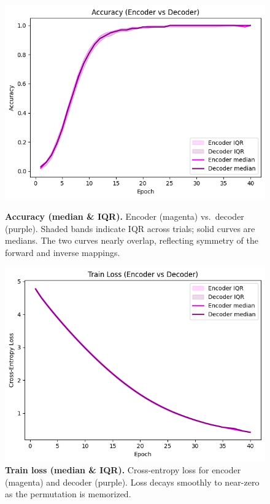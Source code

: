 \documentclass[12pt]{article}
\begin{document}
\begin{figure}[h]
    \centering
    \begin{minipage}[t]{0.48\textwidth}
        \centering
        \includegraphics[width=\textwidth]{accuracy.png}
        \caption{\textbf{Accuracy (median \& IQR).} Encoder (magenta) vs.\ decoder (purple). Shaded bands indicate IQR across trials; solid curves are medians. The two curves nearly overlap, reflecting symmetry of the forward and inverse mappings.}
        \label{fig:acc-curves}
    \end{minipage}
    \hfill
    \begin{minipage}[t]{0.48\textwidth}
        \centering
        \includegraphics[width=\textwidth]{train_loss.png}
        \caption{\textbf{Train loss (median \& IQR).} Cross-entropy loss for encoder (magenta) and decoder (purple). Loss decays smoothly to near-zero as the permutation is memorized.}
        \label{fig:loss-curves}
    \end{minipage}
\end{figure}
\end{document}
